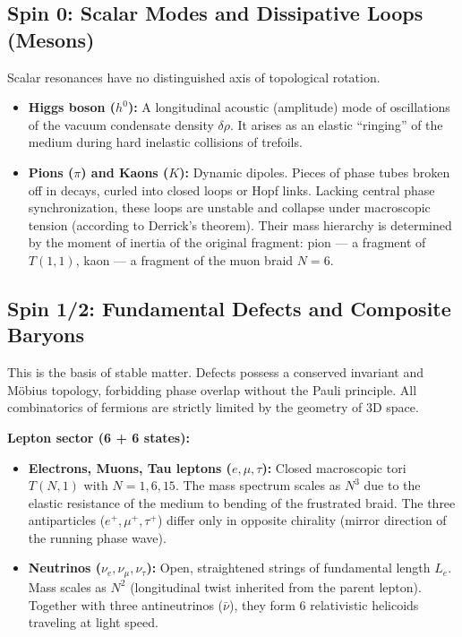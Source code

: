 \documentclass[11pt,a4paper]{article}
\begin{document}
\subsection{Spin 0: Scalar Modes and Dissipative Loops (Mesons)}
Scalar resonances have no distinguished axis of topological rotation.
\begin{itemize}
\item \textbf{Higgs boson ($h^0$):} A longitudinal acoustic (amplitude) mode of oscillations of the vacuum condensate density $\delta \rho$. It arises as an elastic ``ringing'' of the medium during hard inelastic collisions of trefoils.
\item \textbf{Pions ($\pi$) and Kaons ($K$):} Dynamic dipoles. Pieces of phase tubes broken off in decays, curled into closed loops or Hopf links. Lacking central phase synchronization, these loops are unstable and collapse under macroscopic tension (according to Derrick's theorem). Their mass hierarchy is determined by the moment of inertia of the original fragment: pion — a fragment of $T(1,1)$, kaon — a fragment of the muon braid $N=6$.
\end{itemize}

\subsection{Spin 1/2: Fundamental Defects and Composite Baryons}
This is the basis of stable matter. Defects possess a conserved invariant and Möbius topology, forbidding phase overlap without the Pauli principle. All combinatorics of fermions are strictly limited by the geometry of 3D space.

\textbf{Lepton sector (6 + 6 states):}
\begin{itemize}
\item \textbf{Electrons, Muons, Tau leptons ($e, \mu, \tau$):} Closed macroscopic tori $T(N,1)$ with $N = 1, 6, 15$. The mass spectrum scales as $N^3$ due to the elastic resistance of the medium to bending of the frustrated braid. The three antiparticles ($e^+, \mu^+, \tau^+$) differ only in opposite chirality (mirror direction of the running phase wave).
\item \textbf{Neutrinos ($\nu_e, \nu_\mu, \nu_\tau$):} Open, straightened strings of fundamental length $L_e$. Mass scales as $N^2$ (longitudinal twist inherited from the parent lepton). Together with three antineutrinos ($\bar{\nu}$), they form 6 relativistic helicoids traveling at light speed.
\end{itemize}
\end{document}
